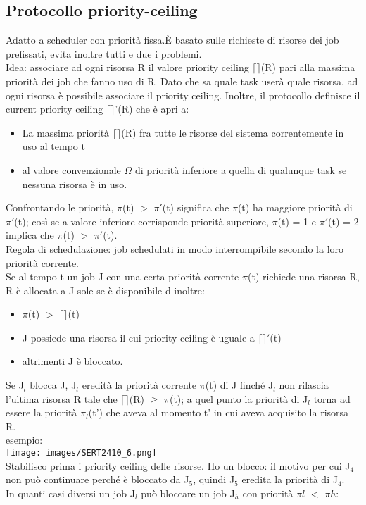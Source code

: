 \documentclass[18px]{article}
\begin{document}
\subsection{Protocollo priority-ceiling}
Adatto a scheduler con priorità fissa.È basato sulle richieste di risorse dei job prefissati, evita inoltre tutti e due i problemi.\\ Idea: associare ad ogni risorsa R il valore priority ceiling $\lceil\rceil$(R) pari alla massima priorità dei job che fanno uso di R. Dato che sa quale task userà quale risorsa, ad ogni risorsa è possibile associare il priority ceiling. Inoltre, il protocollo definisce il current priority ceiling $\lceil\rceil$'(R) che è apri a:
\begin{itemize}
\item La massima priorità $\lceil\rceil$(R) fra tutte le risorse del sistema correntemente in uso al tempo t
\item al valore convenzionale $\Omega$ di priorità  inferiore a quella di qualunque task se nessuna risorsa è in uso.
\end{itemize}
Confrontando le priorità, $\pi$(t) $>$ $\pi'$(t) significa che $\pi$(t) ha maggiore priorità di $\pi'$(t); così se a valore inferiore corrisponde priorità superiore, $\pi$(t) = 1 e $\pi'$(t) = 2 implica che $\pi$(t) $>$ $\pi'$(t).\\ Regola di schedulazione: job schedulati in modo interrompibile secondo la loro priorità corrente.\\ Se al tempo t un job J con una certa priorità corrente $\pi$(t) richiede una risorsa R, R è allocata a J sole se è disponibile d inoltre:
\begin{itemize}
\item $\pi$(t) $>$ $\lceil\rceil$(t)
\item J possiede una risorsa il cui priority ceiling è uguale a $\lceil\rceil'$(t)
\item altrimenti J è bloccato.
\end{itemize}
Se J$_{l}$ blocca J, J$_{l}$ eredità la priorità corrente $\pi$(t) di J finché J$_{l}$ non rilascia l'ultima risorsa R tale che $\lceil\rceil$(R) $\geq$ $\pi$(t); a quel punto la priorità di J$_{l}$ torna ad essere la priorità $\pi_{l}$(t') che aveva al momento t' in cui aveva acquisito la risorsa R.\\ esempio:\\
\texttt{[image: images/SERT2410\_6.png]}\\
Stabilisco prima i priority ceiling delle risorse. Ho un blocco: il motivo per cui J$_{4}$ non può continuare perché è bloccato da J$_{5}$, quindi J$_{5}$ eredita la priorità di J$_{4}$.\\ In quanti casi diversi un job J$_{l}$ può bloccare un job J$_{h}$ con priorità $\pi{l}$ $<$ $\pi{h}$:
\end{document}
